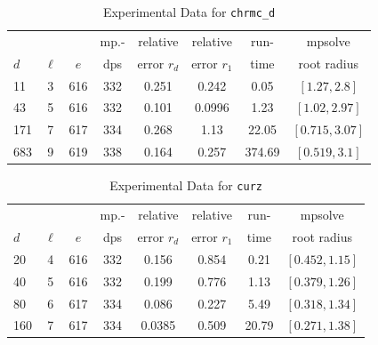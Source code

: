 \documentclass[runningheads]{llncs}
\begin{document}
\begin{table}
\caption{Experimental Data for \texttt{chrmc\_d}} %
\label{tab:chrmc_d}
\vskip -0.15in
\begin{center}
\begin{small}
\begin{sc}
\begin{tabular}{lccccccc}
\toprule
&  &  & mp.-& relative  & relative & run- & mpsolve \\
$d$& $\ell$& $e$ & dps&error $r_d$       & error $r_1$ &time& root radius\\
\midrule
11 & 3 & 616 & 332 & 0.251 & 0.242 & 0.05 & $[1.27, 2.8]$\\
 43 & 5 & 616 & 332 & 0.101 & 0.0996 & 1.23 & $[1.02, 2.97]$\\
 171 & 7 & 617 & 334 & 0.268 & 1.13 & 22.05 & $[0.715, 3.07]$\\
 683 & 9 & 619 & 338 & 0.164 & 0.257 & 374.69 & $[0.519, 3.1]$\\
\bottomrule
\end{tabular}
\end{sc}
\end{small}
\end{center}
\vskip 0.05in
\end{table}


\begin{table}
\caption{Experimental Data for \texttt{curz}} %
\label{tab:curz}
\vskip -0.15in
\begin{center}
\begin{small}
\begin{sc}
\begin{tabular}{lccccccc}
\toprule
             &  &  & mp.-& relative  & relative & run- & mpsolve \\
$d$& $\ell$& $e$ & dps&error $r_d$       & error $r_1$ &time& root radius\\
\midrule
 20 & 4 & 616 & 332 & 0.156 & 0.854 & 0.21 & $[0.452, 1.15]$\\
 40 & 5 & 616 & 332 & 0.199 & 0.776 & 1.13 & $[0.379, 1.26]$\\
 80 & 6 & 617 & 334 & 0.086 & 0.227 & 5.49 & $[0.318, 1.34]$\\
 160 & 7 & 617 & 334 & 0.0385 & 0.509 & 20.79 & $[0.271, 1.38]$\\
\bottomrule
\end{tabular}
\end{sc}
\end{small}
\end{center}
\vskip 0.05in
\end{table}
\end{document}
